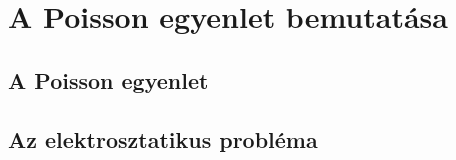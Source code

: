 \chapter{A Poisson egyenlet bemutatása}
\section{A Poisson egyenlet}


\section{Az elektrosztatikus probléma}





















